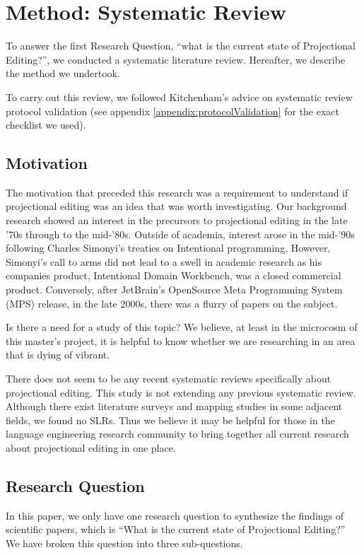 \section{Method: Systematic Review}
\label{section:Method_systematic_review}

To answer the first Research Question, ``what is the current state of Projectional Editing?'', we conducted a systematic literature review.
Hereafter, we describe the method we undertook.

To carry out this review, we followed Kitchenham's\cite{Kitchenham_2015} advice on systematic review protocol validation (see appendix \ref{appendix:protocolValidation} for the exact checklist we used).

\subsection{Motivation}
The motivation that preceded this research was a requirement to understand if projectional editing was an idea that was worth investigating.
Our background research showed an interest in the precursors to projectional editing in the late '70s through to the mid-'80s.
Outside of academia, interest arose in the mid-'90s following Charles Simonyi's treaties on Intentional programming.
However, Simonyi's call to arms did not lead to a swell in academic research as his companies product, Intentional Domain Workbench, was a closed commercial product.
Conversely, after JetBrain's OpenSource Meta Programming System (MPS) release, in the late 2000s, there was a flurry of papers on the subject.

Is there a need for a study of this topic? 
We believe, at least in the microcosm of this master's project, it is helpful to know whether we are researching in an area that is dying of vibrant.

There does not seem to be any recent systematic reviews specifically about projectional editing.
This study is not extending any previous systematic review.
Although there exist literature surveys and mapping studies in some adjacent fields, we found no SLRs.
Thus we believe it may be helpful for those in the language engineering research community to bring together all current research about projectional editing in one place.

\subsection{Research Question}
In this paper, we only have one research question to synthesize the findings of scientific papers, which is ``What is the current state of Projectional Editing?''
We have broken this question into three sub-questions.


